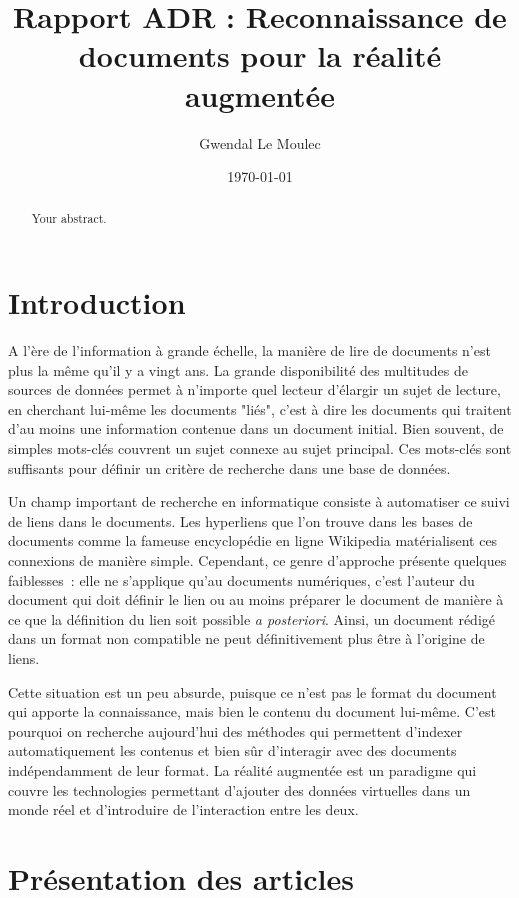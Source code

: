 \documentclass[a4paper]{article}
\title{Rapport ADR : Reconnaissance de documents pour la réalité augmentée}
\author{Gwendal Le Moulec}
\date{\today}
\begin{document}
\maketitle

\begin{abstract}
Your abstract.
\end{abstract}

\section{Introduction}

A l'ère de l'information à grande échelle, la manière de lire de documents n'est plus la même qu'il y a vingt ans. La grande disponibilité des multitudes de sources de données permet à n'importe quel lecteur d'élargir un sujet de lecture, en cherchant lui-même les documents "liés", c'est à dire les documents qui traitent d'au moins une information contenue dans un document initial. Bien souvent, de simples mots-clés couvrent un sujet connexe au sujet principal. Ces mots-clés sont suffisants pour définir un critère de recherche dans une base de données.

Un champ important de recherche en informatique consiste à automatiser ce suivi de liens dans le documents. Les hyperliens que l'on trouve dans les bases de documents comme la fameuse encyclopédie en ligne Wikipedia matérialisent ces connexions de manière simple. Cependant, ce genre d'approche présente quelques faiblesses~: elle ne s'applique qu'au documents numériques, c'est l'auteur du document qui doit définir le lien ou au moins préparer le document de manière à ce que la définition du lien soit possible \textit{a posteriori}. Ainsi, un document rédigé dans un format non compatible ne peut définitivement plus être à l'origine de liens.

Cette situation est un peu absurde, puisque ce n'est pas le format du document qui apporte la connaissance, mais bien le contenu du document lui-même. C'est pourquoi on recherche aujourd'hui des méthodes qui permettent d'indexer automatiquement les contenus et bien sûr d'interagir avec des documents indépendamment de leur format. La réalité augmentée est un paradigme qui couvre les technologies permettant d'ajouter des données virtuelles dans un monde réel et d'introduire de l'interaction entre les deux\cite{augmented-reality}.

\section{Présentation des articles}
\end{document}
